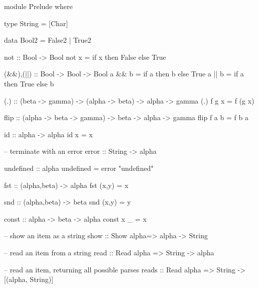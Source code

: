 \begin{code}
module Prelude where

type String = [Char]

data Bool2 = False2 | True2

not :: Bool -> Bool
not x = if x then False else True

(&&),(||) :: Bool -> Bool -> Bool
a && b = if a then b else True
a || b = if a then True else b

(.) :: (beta -> gamma) -> (alpha -> beta) -> alpha -> gamma
(.) f g x = f (g x)

flip :: (alpha -> beta -> gamma) -> beta -> alpha -> gamma
flip f a b = f b a

id :: alpha -> alpha
id x = x

-- terminate with an error
error :: String -> alpha
\end{code}\begin{code}
undefined :: alpha
undefined = error "undefined"

fst :: (alpha,beta) -> alpha
fst (x,y) = x

snd :: (alpha,beta) -> beta
snd (x,y) = y

const :: alpha -> beta -> alpha
const x _ =  x

-- show an item as a string
show :: Show alpha=> alpha -> String

-- read an item from a string
read :: Read alpha => String -> alpha

-- read an item, returning all possible parses
reads :: Read alpha => String -> [(alpha, String)]
\end{code}



